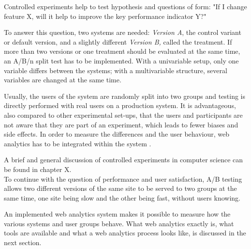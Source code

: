 Controlled experiments help to test hypothesis and questions of form: "If I change feature X, will it help to improve the key performance indicator Y?"

To answer this question,  two systems are needed: \textit{Version A}, the control variant or default version, and a slightly different \textit{Version B,} called the treatment.
If more than two versions or one treatment should be evaluated at the same time,  an A/B/n split test has to be implemented.
With a univariable setup, only one variable differs between the systems; with a multivariable structure, several variables are changed at the same time.

Usually, the users of the system are randomly split into two groups and testing is directly performed with real users on a production system.
It is advantageous, also compared to other experimental set-ups, that the users and participants are not aware that they are part of an experiment, which leads to fewer biases and side effects.
In order to measure the differences and the user behaviour, web analytics has to be integrated within the system \cite{2016Kohavi}.

A brief and general discussion of controlled experiments in computer science can be found in chapter X.  %
\\

To continue with the question of performance and user satisfaction, A/B testing allows two different versions of the same site to be served to two groups at the same time, one site being slow and the other being fast, without users knowing.

An implemented web analytics system makes it possible to measure how the various systems and user groups behave.
What web analytics exactly is, what tools are available and what a web analytics process looks like, is discussed in the next section.




